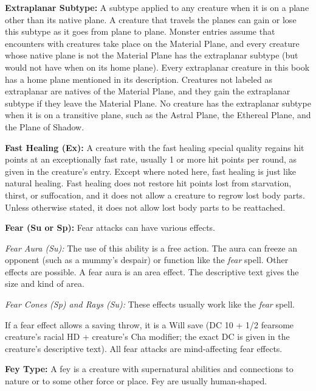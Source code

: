\documentclass{article}
\begin{document}
\vspace{12pt}
\textbf{Extraplanar Subtype:} A subtype applied to any creature when it is on a 
plane other than its native plane. A creature that travels the planes can gain 
or lose this subtype as it goes from plane to plane. Monster entries assume that 
encounters with creatures take place on the Material Plane, and every creature 
whose native plane is not the Material Plane has the extraplanar subtype (but would 
not have when on its home plane). Every extraplanar creature in this book has a 
home plane mentioned in its description. Creatures not labeled as extraplanar are 
natives of the Material Plane, and they gain the extraplanar subtype if they leave 
the Material Plane. No creature has the extraplanar subtype when it is on a transitive 
plane, such as the Astral Plane, the Ethereal Plane, and the Plane of Shadow.

\vspace{12pt}
\textbf{Fast Healing (Ex):} A creature with the fast healing special quality regains 
hit points at an exceptionally fast rate, usually 1 or more hit points per round, 
as given in the creature's entry. Except where noted here, fast healing is just 
like natural healing. Fast healing does not restore hit points lost from starvation, 
thirst, or suffocation, and it does not allow a creature to regrow lost body parts. 
Unless otherwise stated, it does not allow lost body parts to be reattached.

\vspace{12pt}
\textbf{Fear (Su or Sp):} Fear attacks can have various effects.

\textit{Fear Aura (Su): }The use of this ability is a free action. The aura can 
freeze an opponent (such as a mummy's despair) or function like the \textit{fear 
}spell. Other effects are possible. A fear aura is an area effect. The descriptive 
text gives the size and kind of area.

\textit{Fear Cones (Sp) and Rays (Su): }These effects usually work like the \textit{fear 
}spell. 

If a fear effect allows a saving throw, it is a Will save (DC 10 + 1/2 fearsome 
creature's racial HD + creature's Cha modifier; the exact DC is given in the creature's 
descriptive text). All fear attacks are mind-affecting fear effects.

\vspace{12pt}
\textbf{Fey Type:} A fey is a creature with supernatural abilities and connections 
to nature or to some other force or place. Fey are usually human-shaped.
\end{document}
